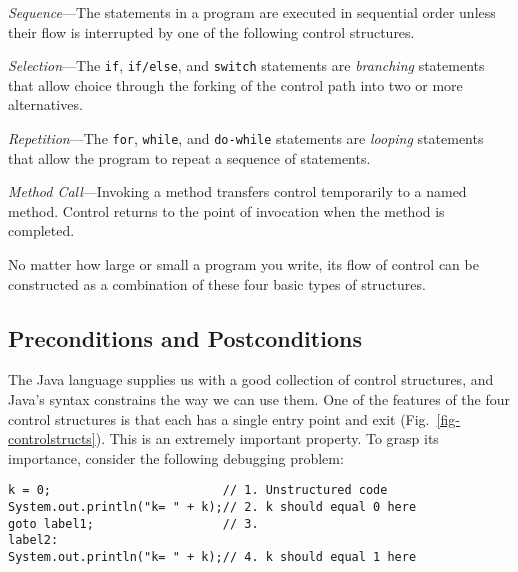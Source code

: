 \begin{BL}
\item  {\it Sequence}---The statements in a program are executed in
sequential order unless their flow is interrupted by one of the
following control structures.

\item  {\it Selection}---The {\tt if}, {\tt if/else}, and {\tt switch}
statements are {\it branching} statements that allow choice through
the forking of the control path into two or more alternatives.

\item  {\it Repetition}---The {\tt for}, {\tt while}, and {\tt do-while}
statements are {\it looping} statements that allow the program to
repeat a sequence of statements.

\item  {\it Method Call}---Invoking a method transfers control temporarily
to a named method. Control returns to the point of invocation when the
method is completed.

\end{BL}

\noindent No matter how large or small a program you write, its flow of
control can be constructed as a combination of these four basic types
of structures.






\subsection*{Preconditions and Postconditions}
\noindent The Java language supplies us with a good collection of control
structures, and Java's syntax constrains the way we can use them. One of
the features of the four control structures is that each has a single
entry point and exit (Fig.~\ref{fig-controlstructs}). This is an
extremely important property. To grasp its importance, consider the
following debugging problem:

\begin{jjjlisting}
\begin{lstlisting}
k = 0;                        // 1. Unstructured code
System.out.println("k= " + k);// 2. k should equal 0 here
goto label1;                  // 3.
label2:
System.out.println("k= " + k);// 4. k should equal 1 here
\end{lstlisting}
\end{jjjlisting}

